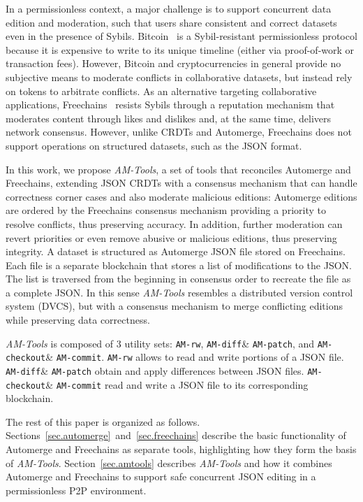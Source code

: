\documentclass[12pt]{article}
\newcommand{\AMT}      {\emph{AM-Tools}\xspace}
\newcommand{\amrw}       {\texttt{AM-rw}\xspace}
\newcommand{\amdiff}     {\texttt{AM-diff}\xspace}
\newcommand{\ampatch}    {\texttt{AM-patch}\xspace}
\newcommand{\amcheckout} {\texttt{AM-checkout}\xspace}
\newcommand{\amcommit}   {\texttt{AM-commit}\xspace}
\begin{document}
In a permissionless context, a major challenge is to support concurrent data
edition and moderation, such that users share consistent and correct datasets
even in the presence of Sybils.
%
Bitcoin~\cite{nakamoto2008bitcoin} is a Sybil-resistant permissionless protocol
because it is expensive to write to its unique timeline (either via
proof-of-work or transaction fees).
However, Bitcoin and cryptocurrencies in general provide no subjective means to
moderate conflicts in collaborative datasets, but instead rely on tokens to
arbitrate conflicts.
%
As an alternative targeting collaborative applications,
Freechains~\cite{sant2020freechains} resists Sybils through a reputation
mechanism that moderates content through likes and dislikes and, at the same
time, delivers network consensus.
However, unlike CRDTs and Automerge, Freechains does not support operations on
structured datasets, such as the JSON format.

In this work, we propose \AMT, a set of tools that reconciles Automerge and
Freechains, extending JSON CRDTs with a consensus mechanism that can handle
correctness corner cases and also moderate malicious editions:
Automerge editions are ordered by the Freechains consensus mechanism providing
a priority to resolve conflicts, thus preserving accuracy.
In addition, further moderation can revert priorities or even remove abusive or
malicious editions, thus preserving integrity.
%
A dataset is structured as Automerge JSON file stored on Freechains.
Each file is a separate blockchain that stores a list of modifications to the
JSON.
The list is traversed from the beginning in consensus order to recreate the
file as a complete JSON.
%
In this sense \AMT resembles a distributed version control system (DVCS), but
with a consensus mechanism to merge conflicting editions while
preserving data correctness.

\AMT is composed of 3 utility sets:
    \amrw,
    \amdiff \& \ampatch, and
    \amcheckout \& \amcommit.
%
\amrw allows to read and write portions of a JSON file.
\amdiff \& \ampatch obtain and apply differences between JSON files.
\amcheckout \& \amcommit read and write a JSON file to its corresponding
blockchain.

The rest of this paper is organized as follows.
Sections~\ref{sec.automerge}~and~\ref{sec.freechains} describe the basic
functionality of Automerge and Freechains as separate tools, highlighting how
they form the basis of \AMT.
Section~\ref{sec.amtools} describes \AMT and how it combines Automerge and
Freechains to support safe concurrent JSON editing in a permissionless P2P
environment.
\end{document}
